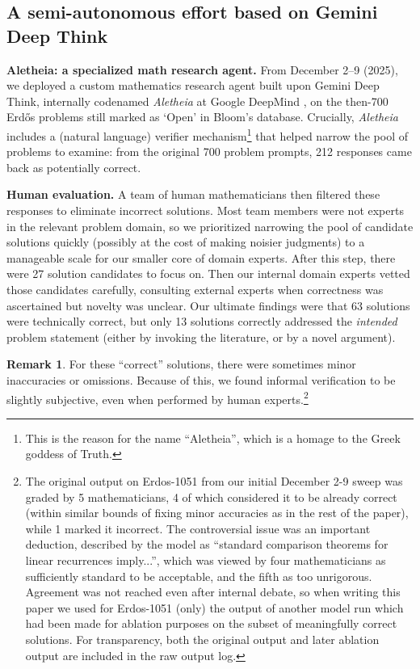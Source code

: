 \documentclass{article}
\theoremstyle{plain}
\theoremstyle{definition}
\newtheorem{remark}{Remark}[section]
\newcommand{\Aletheia}{\emph{Aletheia}}
\begin{document}

\subsection{A semi-autonomous effort based on Gemini Deep Think}\label{ssec:intro-results}
\textbf{Aletheia: a specialized math research agent.} From December 2--9 (2025), we deployed a custom mathematics research agent built upon Gemini Deep Think, internally codenamed {\Aletheia} at Google DeepMind \cite{aletheia}, on the then-700 Erd\H{o}s problems still marked as `Open' in Bloom's database. Crucially, {\Aletheia} includes a (natural language) verifier mechanism\footnote{This is the reason for the name ``Aletheia'', which is a homage to the Greek goddess of Truth.} that helped narrow the pool of problems to examine: from the original 700 problem prompts, 212 responses came back as potentially correct.

\textbf{Human evaluation.} A team of human mathematicians then filtered these responses to eliminate incorrect solutions. Most team members were not experts in the relevant problem domain, so we prioritized narrowing the pool of candidate solutions quickly (possibly at the cost of making noisier judgments) to a manageable scale for our smaller core of domain experts. After this step, there were 27 solution candidates to focus on. Then our internal domain experts vetted those candidates carefully, consulting external experts when correctness was ascertained but novelty was unclear. Our ultimate findings were that 63 solutions were technically correct, but only 13 solutions correctly addressed the \emph{intended} problem statement (either by invoking the literature, or by a novel argument).

\begin{remark} For these ``correct'' solutions, there were sometimes minor inaccuracies or omissions. Because of this, we found informal verification to be slightly subjective, even when performed by human experts.\footnote{The original output on Erdos-1051 from our initial December 2-9 sweep was graded by 5 mathematicians, 4 of which considered it to be already correct (within similar bounds of fixing minor accuracies as in the rest of the paper), while 1 marked it incorrect. The controversial issue was an important deduction, described by the model as ``standard comparison theorems for linear recurrences imply...'', which was viewed by four mathematicians as sufficiently standard to be acceptable, and the fifth as too unrigorous. Agreement was not reached even after internal debate, so when writing this paper we used for Erdos-1051 (only) the output of another model run which had been made for ablation purposes on the subset of meaningfully correct solutions. For transparency, both the original output and later ablation output are included in the raw output log.} 
\end{remark}
\end{document}
